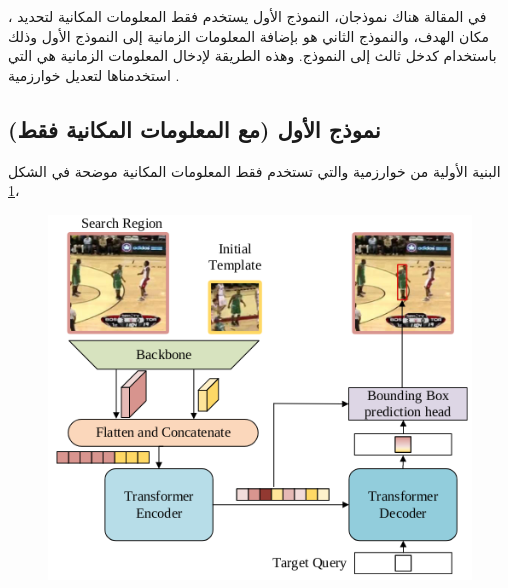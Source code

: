 \section{ \label{section:stark}}
،
في المقالة 
 هناك نموذجان، النموذج الأول يستخدم فقط المعلومات المكانية لتحديد مكان الهدف، والنموذج الثاني هو بإضافة المعلومات الزمانية إلى النموذج الأول وذلك باستخدام 
كدخل ثالث إلى النموذج. وهذه الطريقة لإدخال المعلومات الزمانية هي التي استخدمناها لتعديل خوارزمية 
.
\subsection{نموذج
الأول (مع المعلومات المكانية فقط)
}
البنية الأولية من خوارزمية 
 والتي تستخدم فقط المعلومات المكانية موضحة في الشكل
 \ref{stark_base}،
 
 \begin{figure}[H]
\centerline{\includegraphics[scale=0.5]{images/stark_base}}
 	\caption{}
 	\label{stark_base}
 \end{figure}
 \vspace{-8.0mm}
 \centerline{}

